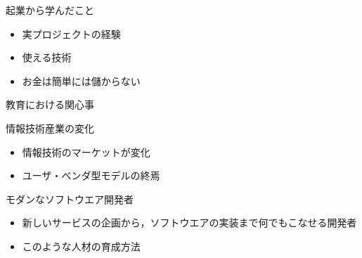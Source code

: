 \documentclass[t, aspectratio=169]{beamer}
\begin{document}
\begin{frame}[label=sec-1-1-7]{起業から学んだこと}
\begin{itemize}
\item 実プロジェクトの経験
\item 使える技術
\item お金は簡単には儲からない
\end{itemize}
\end{frame}
\begin{frame}[label=sec-1-1-8]{教育における関心事}
\begin{block}{情報技術産業の変化}
\begin{itemize}
\item 情報技術のマーケットが変化
\item ユーザ・ベンダ型モデルの終焉
\end{itemize}
\end{block}
\begin{block}{モダンなソフトウエア開発者}
\begin{itemize}
\item 新しいサービスの企画から，ソフトウエアの実装まで何でもこなせる開発者
\item このような人材の育成方法
\end{itemize}
\end{block}
\end{frame}
\end{document}
